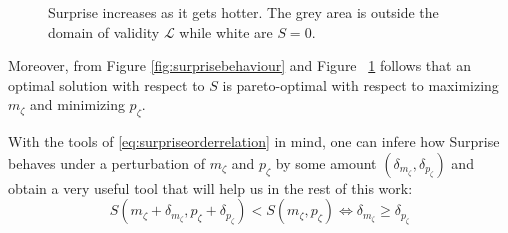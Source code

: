 \begin{figure}[htb]
\centering
{}
\caption{Surprise increases as it gets hotter. The grey area is outside the domain of validity $\mathcal{L}$ while white are $S=0$.}
\label{fig:monotonical_surprise}
\end{figure}

Moreover, from Figure \ref{fig:surprisebehaviour} and Figure ~\ref{fig:monotonical_surprise} follows that an optimal solution with respect to $S$ is pareto-optimal with respect to maximizing $m_\zeta$ and minimizing $p_\zeta$.

With the tools of \ref{eq:surpriseorderrelation} in mind, one can infere how Surprise behaves under a perturbation of $m_\zeta$ and $p_\zeta$ by some amount $(\delta_{m_\zeta},\delta_{p_\zeta})$ and obtain a very useful tool that will help us in the rest of this work:
\begin{equation}\label{eq:resolution_limit_condition}
S(m_\zeta + \delta_{m_\zeta}, p_\zeta + \delta_{p_\zeta}) < S(m_\zeta,p_\zeta) \iff \delta_{m_\zeta} \geq \delta_{p_\zeta}
\end{equation}

